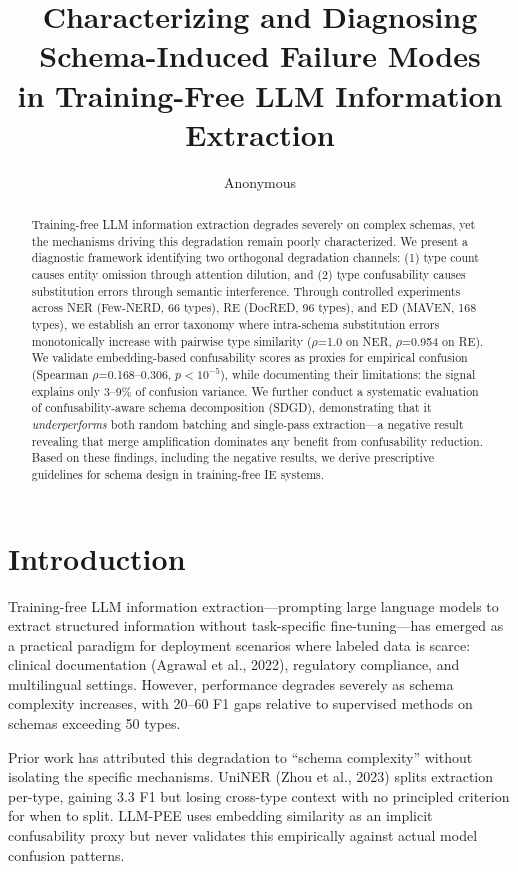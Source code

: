 \documentclass[11pt,a4paper]{article}
\title{Characterizing and Diagnosing Schema-Induced Failure Modes\\in Training-Free LLM Information Extraction}
\author{Anonymous}
\begin{document}
\maketitle

\begin{abstract}
Training-free LLM information extraction degrades severely on complex schemas, yet the mechanisms driving this degradation remain poorly characterized. We present a diagnostic framework identifying two orthogonal degradation channels: (1) type count causes entity omission through attention dilution, and (2) type confusability causes substitution errors through semantic interference. Through controlled experiments across NER (Few-NERD, 66 types), RE (DocRED, 96 types), and ED (MAVEN, 168 types), we establish an error taxonomy where intra-schema substitution errors monotonically increase with pairwise type similarity ($\rho$=1.0 on NER, $\rho$=0.954 on RE). We validate embedding-based confusability scores as proxies for empirical confusion (Spearman $\rho$=0.168--0.306, $p<10^{-5}$), while documenting their limitations: the signal explains only 3--9\% of confusion variance. We further conduct a systematic evaluation of confusability-aware schema decomposition (SDGD), demonstrating that it \emph{underperforms} both random batching and single-pass extraction---a negative result revealing that merge amplification dominates any benefit from confusability reduction. Based on these findings, including the negative results, we derive prescriptive guidelines for schema design in training-free IE systems.
\end{abstract}

\section{Introduction}

Training-free LLM information extraction---prompting large language models to extract structured information without task-specific fine-tuning---has emerged as a practical paradigm for deployment scenarios where labeled data is scarce: clinical documentation (Agrawal et al., 2022), regulatory compliance, and multilingual settings. However, performance degrades severely as schema complexity increases, with 20--60 F1 gaps relative to supervised methods on schemas exceeding 50 types.

Prior work has attributed this degradation to ``schema complexity'' without isolating the specific mechanisms. UniNER (Zhou et al., 2023) splits extraction per-type, gaining 3.3 F1 but losing cross-type context with no principled criterion for when to split. LLM-PEE uses embedding similarity as an implicit confusability proxy but never validates this empirically against actual model confusion patterns.
\end{document}
